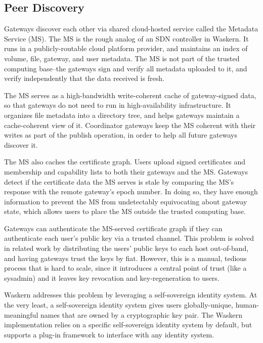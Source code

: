 \subsection{Peer Discovery}

Gateways discover each other via shared cloud-hosted service called the Metadata
Service (MS). The MS is the rough analog of an SDN controller in Waskern. It
runs in a publicly-routable cloud platform provider, and maintains an index of
volume, file, gateway, and user metadata. The MS is not part of the trusted
computing base--the gateways sign and verify all metadata uploaded to it, and
verify independently that the data received is fresh.


The MS serves as a high-bandwidth write-coherent cache of gateway-signed data,
so that gateways do not need to run in high-availability infrastructure. It
organizes file metadata into a directory tree, and helps gateways maintain a
cache-coherent view of it. Coordinator gateways keep the MS coherent with their
writes as part of the publish operation, in order to help all future gateways
discover it.


The MS also caches the certificate graph. Users upload signed certificates and
membership and capability lists to both their gateways and the MS. Gateways
detect if the certificate data the MS serves is stale by comparing the MS's
response with the remote gateway's epoch number. In doing so, they have
enough information to prevent the MS from undetectably equivocating about
gateway state, which allows users to place the MS outside the trusted computing
base.


Gateways can authenticate the MS-served certificate graph if they can
authenticate each user's public key via a trusted channel. This problem is
solved in related work by distributing the users' public keys to
each host out-of-band, and having gateways trust the keys by fiat. However, this
is a manual, tedious process that is hard to scale, since it introduces a
central point of trust (like a sysadmin) and it leaves key revocation and
key-regeneration to users.

Waskern addresses this problem by leveraging a self-sovereign identity system.
At the very least, a self-sovereign identity system gives users globally-unique, human-meaningful
names that are owned by a cryptographic key pair.  The Waskern implementation
relies on a specific self-sovereign identity system by default, but supports a plug-in framework to interface
with any identity system.


